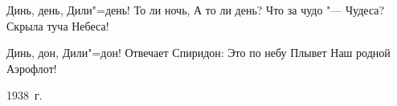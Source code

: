 Динь, день, 
Дили"=день! 
То ли ночь, 
А то ли день? 
Что за чудо "---
Чудеса? 
Скрыла туча 
Небеса!

Динь, дон, 
Дили"=дон! 
Отвечает 
Спиридон: 
Это по небу 
Плывет 
Наш родной 
Аэрофлот!

1938~г.
